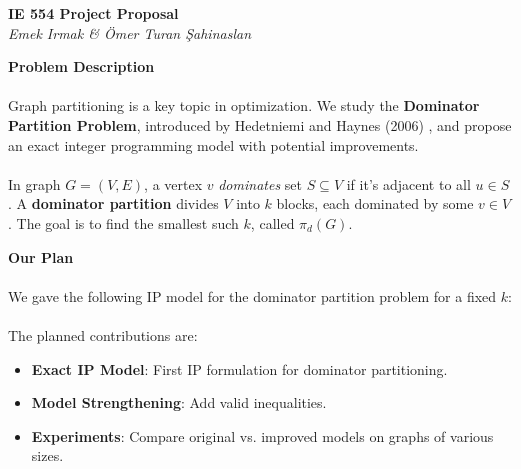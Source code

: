 \documentclass[12pt]{article}
\begin{document}

\begin{center}
    \Large \textbf{IE 554 Project Proposal} \\
    \normalsize \textsl{Emek Irmak \& Ömer Turan Şahinaslan}
\end{center}

\textbf{\large Problem Description}
\vspace*{-2mm}

\paragraph{} Graph partitioning is a key topic in optimization. We study the \textbf{Dominator Partition Problem}, introduced by Hedetniemi and Haynes (2006) \cite{dominator_partitions}, and propose an exact integer programming model with potential improvements.

\paragraph{} In graph $G = (V, E)$, a vertex $v$ \textit{dominates} set $S \subseteq V$ if it's adjacent to all $u \in S$. A \textbf{dominator partition} divides $V$ into $k$ blocks, each dominated by some $v \in V$. The goal is to find the smallest such $k$, called $\pi_d(G)$.

\vspace{5mm}

\textbf{\large Our Plan}
\vspace*{-2mm}

\paragraph{} We gave the following IP model for the dominator partition problem for a fixed $k$:

\hspace{4mm}
\scalebox{0.95}{%
  \parbox{\linewidth}{%
  }%
}

\vspace{-6mm}
\paragraph{} The planned contributions are:
\begin{itemize}[label=, itemsep=0pt]
    \item \textbf{Exact IP Model}: First IP formulation for dominator partitioning.
    \item \textbf{Model Strengthening}: Add valid inequalities.
    \item \textbf{Experiments}: Compare original vs. improved models on graphs of various sizes.
\end{itemize}
\end{document}
